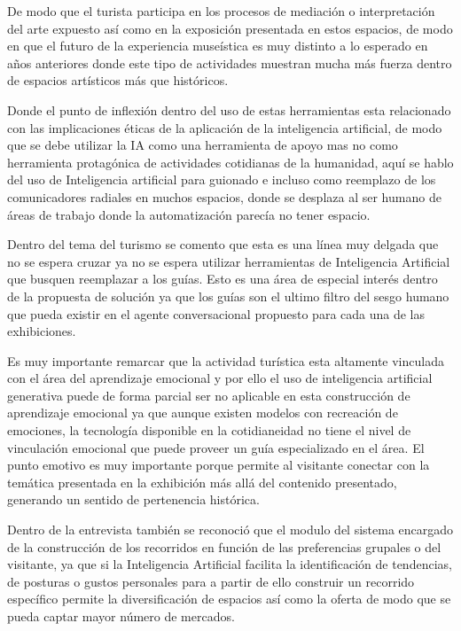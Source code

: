 \documentclass[pdflatex,sn-mathphys-num]{sn-jnl}%
\theoremstyle{thmstyleone}%
\theoremstyle{thmstyletwo}%
\theoremstyle{thmstylethree}%
\begin{document}
De modo que el turista participa en los procesos de mediación o interpretación del arte expuesto así como en la exposición presentada en estos espacios, de modo en que el futuro de la experiencia museística es muy distinto a lo esperado en años anteriores donde este tipo de actividades muestran mucha más fuerza dentro de espacios artísticos más que históricos.

Donde el punto de inflexión dentro del uso de estas herramientas esta relacionado con las implicaciones éticas de la aplicación de la inteligencia artificial, de modo que se debe utilizar la IA como una herramienta de apoyo mas no como herramienta protagónica de actividades cotidianas de la humanidad, aquí se hablo del uso de Inteligencia artificial para guionado e incluso como reemplazo de los comunicadores radiales en muchos espacios, donde se desplaza al ser humano de áreas de trabajo donde la automatización parecía no tener espacio.

Dentro del tema del turismo se comento que esta es una línea muy delgada que no se espera cruzar ya no se espera utilizar herramientas de Inteligencia Artificial que busquen reemplazar a los guías. Esto es una área de especial interés dentro de la propuesta de solución ya que los guías son el ultimo filtro del sesgo humano que pueda existir en el agente conversacional propuesto para cada una de las exhibiciones.

Es muy importante remarcar que la actividad turística esta altamente vinculada con el área del aprendizaje emocional y por ello el uso de inteligencia artificial generativa puede de forma parcial ser no aplicable en esta construcción de aprendizaje emocional ya que aunque existen modelos con recreación de emociones, la tecnología disponible en la cotidianeidad no tiene el nivel de vinculación emocional que puede proveer un guía especializado en el área. El punto emotivo es muy importante porque permite al visitante conectar con la temática presentada en la exhibición más allá del contenido presentado, generando un sentido de pertenencia histórica.

Dentro de la entrevista también se reconoció que el modulo del sistema encargado de la construcción de los recorridos en función de las preferencias grupales o del visitante, ya que si la Inteligencia Artificial facilita la identificación de tendencias, de posturas o gustos personales para a partir de ello construir un recorrido específico permite la diversificación de espacios así como la oferta de modo que se pueda captar mayor número de mercados.
\end{document}
